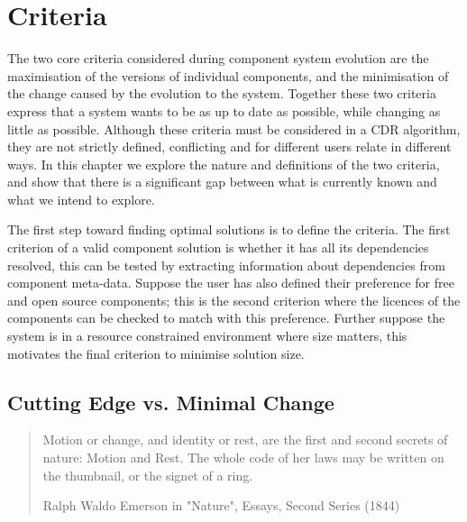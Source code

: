 \chapter{Criteria}
\label{criteria}
The two core criteria considered during component system evolution are the maximisation of the versions of individual components, 
and the minimisation of the change caused by the evolution to the system.
Together these two criteria express that a system wants to be as up to date as possible, while changing as little as possible.
Although these criteria must be considered in a CDR algorithm,
they are not strictly defined, conflicting and for different users relate in different ways.
In this chapter we explore the nature and definitions of the two criteria,
and show that there is a significant gap between what is currently known and what we intend to explore. 

The first step toward finding optimal solutions is to define the criteria.
The first criterion of a valid component solution is whether it has all its dependencies resolved,
this can be tested by extracting information about dependencies from component meta-data.
Suppose the user has also defined their preference for free and open source components;
this is the second criterion where the licences of the components can be checked to match with this preference.
Further suppose the system is in a resource constrained environment where size matters, 
this motivates the final criterion to minimise solution size.



\section{Cutting Edge vs. Minimal Change}
\begin{quotation}
Motion or change, and identity or rest, are the first and second secrets of nature: Motion and Rest. 
The whole code of her laws may be written on the thumbnail, or the signet of a ring.

Ralph Waldo Emerson in "Nature", Essays, Second Series (1844)
\end{quotation}

